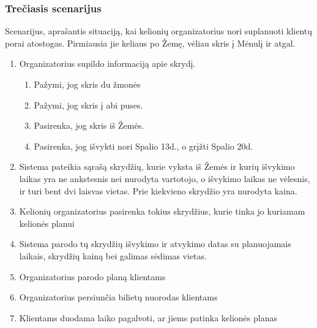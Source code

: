 \documentclass{VUMIFPSkursinis}
\begin{document}
\subsubsection{Trečiasis scenarijus}
Scenarijus, aprašantis situaciją, kai kelionių organizatorius nori suplanuoti klientų porai atostogas. Pirmiausia jie keliaus po Žemę, vėliau skris į Mėnulį ir atgal.
\begin{enumerate}
\item  Organizatorius supildo informaciją apie skrydį.
\begin{enumerate}[label*=\arabic*.]
\item Pažymi, jog skris du žmonės
\item Pažymi, jog skris į abi puses.
\item Pasirenka, jog skris iš Žemės.
\item  Pasirenka, jog išvykti nori Spalio 13d., o grįžti Spalio 20d.
\end{enumerate}
\item  Sistema pateikia sąrašą skrydžių, kurie vyksta iš Žemės ir kurių išvykimo laikas yra ne ankstesnis nei nurodyta vartotojo, o išvykimo laikas ne vėlesnis, ir turi bent dvi laisvas vietas. Prie kiekvieno skrydžio yra nurodyta kaina.
\item Kelionių organizatorius pasirenka tokius skrydžius, kurie tinka jo kuriamam kelionės planui
\item Sistema parodo tų skrydžių išvykimo ir atvykimo datas su planuojamais laikais, skrydžių kainą bei galimas sėdimas vietas.
\item Organizatorius parodo planą klientams
\item Organizatorius persiunčia bilietų nuorodas klientams
\item Klientams duodama laiko pagalvoti, ar jiems patinka kelionės planas
\end{enumerate}
\end{document}
